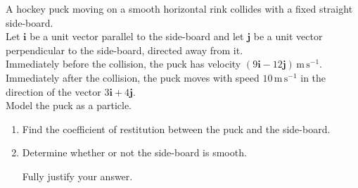 \documentclass[leqno]{article}
\begin{document}
\djsFrontMatter
\begin{enumerate}[
  label=\textbf{\arabic*.},
  leftmargin=*,
  topsep=0pt,
  partopsep=0pt,
  parsep=0pt
]

\questionitem

A hockey puck moving on a smooth horizontal rink collides with a fixed straight side-board. \\
Let $\mathbf{i}$ be a unit vector parallel to the side-board and let $\mathbf{j}$ be a unit vector perpendicular to the side-board, directed away from it. \\

Immediately before the collision, the puck has velocity $(9\mathbf{i}-12\mathbf{j})\,\mathrm{m\,s^{-1}}$. \\

Immediately after the collision, the puck moves with speed $10\,\mathrm{m\,s^{-1}}$ in the direction of the vector $3\mathbf{i}+4\mathbf{j}$. \\

Model the puck as a particle. \\

\begin{enumerate}[label=\textbf{(\alph*)}]
  \item Find the coefficient of restitution between the puck and the side-board.  \\
  \item Determine whether or not the side-board is smooth.

  Fully justify your answer.  \\
\end{enumerate}

\newpage


\questionitem

\begin{figure}[H]
    \centering
{}
\end{figure}
\end{enumerate}
\end{document}
